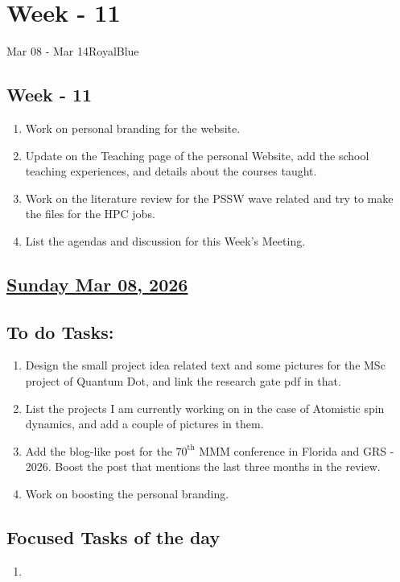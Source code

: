 \section{Week - 11}
\begin{physicsmodule}{Mar 08 - Mar 14}{RoyalBlue}
  \begin{lawbox}
    \subsection*{\sffamily\bfseries Week - 11}
    \begin{enumerate}
    \item Work on personal branding for the website.
    \item Update on the Teaching page of the personal Website, add the school teaching experiences, and details about the courses taught.
    \item Work on the literature review for the PSSW wave related and try to make the files for the HPC jobs.
    \item List the agendas and discussion for this Week's Meeting.
\end{enumerate}
  \end{lawbox}
\end{physicsmodule}
\subsection*{\underline{Sunday Mar 08, 2026}}
\subsection*{To do Tasks:}
\begin{enumerate}
    \item Design the small project idea related text and some pictures for the MSc project of Quantum Dot, and link the research gate pdf in that. 
    \item List the projects I am currently working on in the case of Atomistic spin dynamics, and add a couple of pictures in them.
    \item Add the blog-like post for the $70^\mathrm{th}$ MMM conference in Florida and GRS - 2026. Boost the post that mentions the last three months in the review.
    \item Work on boosting the personal branding.
\end{enumerate}
\subsection*{Focused Tasks of the day}
\begin{enumerate}[\ding{212}]  
    \item 
\end{enumerate}
